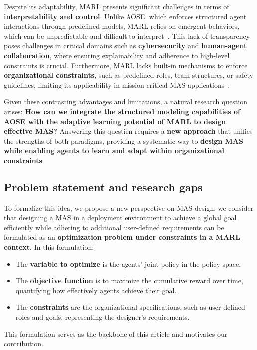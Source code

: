 \documentclass[pdflatex,sn-mathphys-num]{sn-jnl}%
\theoremstyle{thmstyleone}%
\theoremstyle{thmstyletwo}%
\theoremstyle{thmstylethree}%
\begin{document}
Despite its adaptability, MARL presents significant challenges in terms of \textbf{interpretability and control}. Unlike AOSE, which enforces structured agent interactions through predefined models, MARL relies on emergent behaviors, which can be unpredictable and difficult to interpret~\cite{Du2022}. This lack of transparency poses challenges in critical domains such as \textbf{cybersecurity} and \textbf{human-agent collaboration}, where ensuring explainability and adherence to high-level constraints is crucial. Furthermore, MARL lacks built-in mechanisms to enforce \textbf{organizational constraints}, such as predefined roles, team structures, or safety guidelines, limiting its applicability in mission-critical MAS applications~\cite{Nguyen2020}.

Given these contrasting advantages and limitations, a natural research question arises: \textbf{How can we integrate the structured modeling capabilities of AOSE with the adaptive learning potential of MARL to design effective MAS?} Answering this question requires a \textbf{new approach} that unifies the strengths of both paradigms, providing a systematic way to \textbf{design MAS while enabling agents to learn and adapt within organizational constraints}.

\subsection{Problem statement and research gaps}

To formalize this idea, we propose a new perspective on MAS design: we consider that designing a MAS in a deployment environment to achieve a global goal efficiently while adhering to additional user-defined requirements can be formulated as an \textbf{optimization problem under constraints in a MARL context}. In this formulation:
\begin{itemize}
    \item The \textbf{variable to optimize} is the agents' joint policy in the policy space.
    \item The \textbf{objective function} is to maximize the cumulative reward over time, quantifying how effectively agents achieve their goal.
    \item The \textbf{constraints} are the organizational specifications, such as user-defined roles and goals, representing the designer's requirements.
\end{itemize}
This formulation serves as the backbone of this article and motivates our contribution. 
\end{document}
